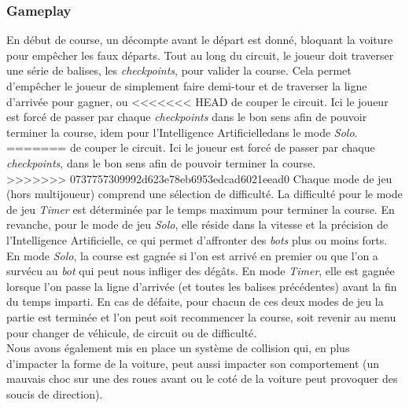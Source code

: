 \documentclass[a4paper,12pt]{article}
\newcommand{\AI}{Intelligence Artificielle}
\begin{document}
            \subsubsection{Gameplay}
                En début de course, un décompte avant le départ est donné, bloquant la voiture pour
                empêcher les faux départs. Tout au long du circuit, le joueur doit traverser une série de 
                balises, les \textit{checkpoints}, pour valider la course. Cela permet d'empêcher le 
                joueur de simplement faire demi-tour et de traverser la ligne d'arrivée pour gagner, ou
<<<<<<< HEAD
                de couper le circuit. Ici le joueur est forcé de passer par chaque \textit{checkpoints}
                dans le bon sens afin de pouvoir terminer la course,
                idem pour l'\AI dans le mode \textsl{Solo}.\\
=======
                de couper le circuit. Ici le joueur est forcé de passer par chaque \textit{checkpoints},
                dans le bon sens afin de pouvoir terminer la course.\\
>>>>>>> 0737757309992d623e78eb6953edcad6021eead0
                Chaque mode de jeu (hors multijoueur) comprend une sélection de difficulté.
                La difficulté pour le mode de jeu \textsl{Timer} est déterminée par le temps maximum pour 
                terminer la course. En revanche, pour le mode de jeu \textsl{Solo}, 
                elle réside dans la vitesse et la précision de l'\AI, ce qui permet d'affronter des 
                \textit{bots} plus ou moins forts. \\
                En mode \textsl{Solo}, la course est gagnée si l'on est arrivé en premier ou que l'on a 
                survécu au \textit{bot} qui peut nous infliger des dégâts. En mode \textsl{Timer}, elle 
                est gagnée lorsque l'on passe la ligne d'arrivée (et toutes les balises précédentes) avant
                la fin du temps imparti. En cas de défaite, pour chacun de ces deux modes de jeu la partie
                est terminée et l'on peut soit recommencer la course, soit revenir au menu pour changer de
                véhicule, de circuit ou de difficulté.\\
                Nous avons également mis en place un système de collision qui, en plus d'impacter la forme de 
                la voiture, peut aussi impacter son comportement (un mauvais choc sur une des roues avant ou 
                le coté de la voiture peut provoquer des soucis de direction).
\end{document}
